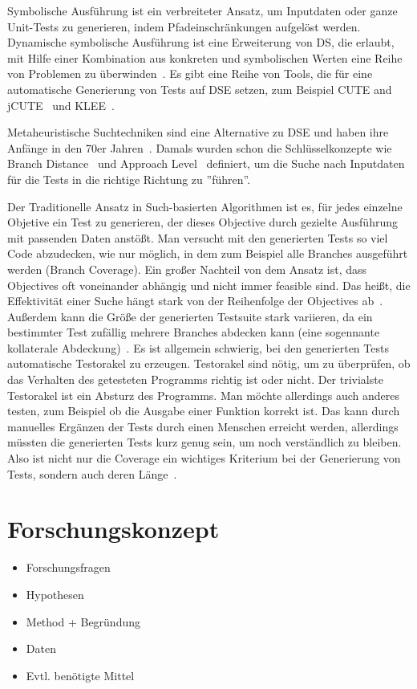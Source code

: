 \documentclass{article}
\begin{document}
Symbolische Ausführung ist ein verbreiteter Ansatz, um Inputdaten oder ganze Unit-Tests zu generieren, indem Pfadeinschränkungen aufgelöst werden. Dynamische symbolische Ausführung ist eine Erweiterung von DS, die erlaubt, mit Hilfe einer Kombination aus konkreten und symbolischen Werten eine Reihe von Problemen zu überwinden~\cite{Fraser_2013}. Es gibt eine Reihe von Tools, die für eine automatische Generierung von Tests auf DSE setzen, zum Beispiel CUTE and jCUTE~\cite{10.1007/11817963_38} und KLEE~\cite{cadar2008klee}. 

Metaheuristische Suchtechniken sind eine Alternative zu DSE und haben ihre Anfänge in den 70er Jahren~\cite{McMinn_2004}. Damals wurden schon die Schlüsselkonzepte wie Branch Distance~\cite{Korel1990} und Approach Level~\cite{Wegener2001} definiert, um die Suche nach Inputdaten für die Tests in die richtige Richtung zu ''führen''.  

Der Traditionelle Ansatz in Such-basierten Algorithmen ist es, für jedes einzelne Objetive ein Test zu generieren, der dieses Objective durch gezielte Ausführung mit passenden Daten anstößt. Man versucht mit den generierten Tests so viel Code abzudecken, wie nur möglich, in dem zum Beispiel alle Branches ausgeführt werden (Branch Coverage). Ein großer Nachteil von dem Ansatz ist, dass Objectives oft voneinander abhängig und nicht immer feasible sind. Das heißt, die Effektivität einer Suche hängt stark von der Reihenfolge der Objectives ab~\cite{Fraser_2013}. Außerdem kann die Größe der generierten Testsuite stark variieren, da ein bestimmter Test zufällig mehrere Branches abdecken kann (eine sogennante kollaterale Abdeckung)~\cite{Harman2010}. Es ist allgemein schwierig, bei den generierten Tests automatische Testorakel zu erzeugen. Testorakel sind nötig, um zu überprüfen, ob das Verhalten des getesteten Programms richtig ist oder nicht. Der trivialste Testorakel ist ein Absturz des Programms.  Man möchte allerdings auch anderes testen, zum Beispiel ob die Ausgabe einer Funktion korrekt ist. Das kann durch manuelles Ergänzen der Tests durch einen Menschen erreicht werden, allerdings müssten die generierten Tests kurz genug sein, um noch verständlich zu bleiben. Also ist nicht nur die Coverage ein wichtiges Kriterium bei der Generierung von Tests, sondern auch deren Länge~\cite{Fraser_2013}. 
\section{Forschungskonzept}
\begin{itemize}
    \item Forschungsfragen
    \item Hypothesen
    \item Method + Begründung
    \item Daten
    \item Evtl. benötigte Mittel
\end{itemize}
\end{document}
